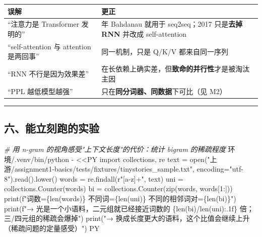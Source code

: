 \documentclass[
  chinese,
  11pt,
]{ctexart}
\newenvironment{Shaded}{}{}
\newcommand{\AttributeTok}[1]{\textcolor[rgb]{0.49,0.56,0.16}{#1}}
\newcommand{\CommentTok}[1]{\textcolor[rgb]{0.38,0.63,0.69}{\textit{#1}}}
\newcommand{\ExtensionTok}[1]{#1}
\newcommand{\OperatorTok}[1]{\textcolor[rgb]{0.40,0.40,0.40}{#1}}
\newcommand{\StringTok}[1]{\textcolor[rgb]{0.25,0.44,0.63}{#1}}
\newcounter{none} %
\begin{document}
{\def\LTcaptype{none} %
\begin{longtable}[]{@{}
  >{\raggedright\arraybackslash}p{}
  >{\raggedright\arraybackslash}p{}@{}}
\toprule\noalign{}
\begin{minipage}[b]{\linewidth}\raggedright
误解
\end{minipage} & \begin{minipage}[b]{\linewidth}\raggedright
更正
\end{minipage} \\
\midrule\noalign{}
\endhead
\bottomrule\noalign{}
\endlastfoot
``注意力是 Transformer 发明的'' & 2014 年 Bahdanau 就用于 seq2seq；2017 只是\textbf{去掉 RNN} 并改成 self-attention \\
``self-attention 与 attention 是两回事'' & 同一机制，只是 Q/K/V 都来自同一序列 \\
``RNN 不行是因为效果差'' & 在长依赖上确实差，但\textbf{致命的并行性}才是被淘汰主因 \\
``PPL 越低模型越强'' & 只在\textbf{同分词器、同数据}下可比（见 M2） \\
\end{longtable}
}

\begin{center}\rule{0.5\linewidth}{0.5pt}\end{center}

\subsection{六、能立刻跑的实验}\label{ux516dux80fdux7acbux523bux8dd1ux7684ux5b9eux9a8c-1}

\begin{Shaded}
\begin{Highlighting}[]
\CommentTok{\# 用 n{-}gram 的视角感受"上下文长度"的代价：统计 bigram 的稀疏程度}
\ExtensionTok{环境/.venv/bin/python} \AttributeTok{{-}} \OperatorTok{\textless{}\textless{}\textquotesingle{}PY\textquotesingle{}}
\StringTok{import collections, re}
\StringTok{text = open("上游/assignment1{-}basics/tests/fixtures/tinystories\_sample.txt", encoding="utf{-}8").read().lower()}
\StringTok{words = re.findall(r"[a{-}z\textquotesingle{}]+", text)}
\StringTok{uni = collections.Counter(words)}
\StringTok{bi  = collections.Counter(zip(words, words[1:]))}
\StringTok{print(f"词数=\{len(words)\}  不同词=\{len(uni)\}  不同的相邻词对=\{len(bi)\}")}
\StringTok{print(f"→ 光是一个小语料，二元组就已经接近词数的 \{len(bi)/len(uni):.1f\} 倍；三/四元组的稀疏会爆掉")}
\StringTok{print("→ 换成长度更大的语料，这个比值会继续上升（稀疏问题的定量感受）")}
\OperatorTok{PY}
\end{Highlighting}
\end{Shaded}
\end{document}
